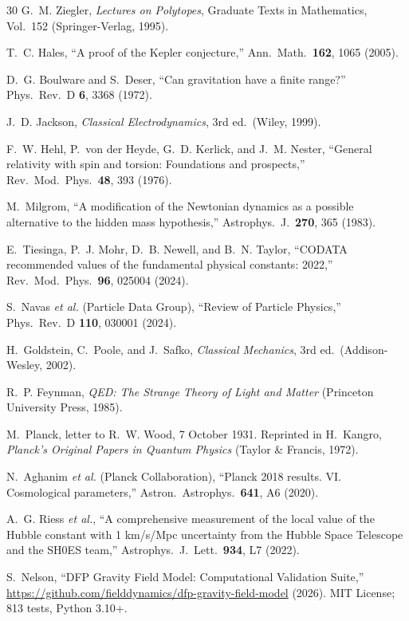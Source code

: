 \documentclass[aps,prd,preprint,superscriptaddress,showpacs,preprintnumbers,amsmath,amssymb,nofootinbib]{revtex4-2}
\begin{document}
\begin{thebibliography}{30}
G.~M. Ziegler, \emph{Lectures on Polytopes}, Graduate Texts in Mathematics, Vol.~152 (Springer-Verlag, 1995).

T.~C. Hales, ``A proof of the Kepler conjecture,'' Ann.\ Math.\ \textbf{162}, 1065 (2005).

D.~G. Boulware and S.~Deser, ``Can gravitation have a finite range?'' Phys.\ Rev.\ D \textbf{6}, 3368 (1972).

J.~D. Jackson, \emph{Classical Electrodynamics}, 3rd ed.\ (Wiley, 1999).

F.~W. Hehl, P.~von der Heyde, G.~D. Kerlick, and J.~M. Nester, ``General relativity with spin and torsion: Foundations and prospects,'' Rev.\ Mod.\ Phys.\ \textbf{48}, 393 (1976).

M.~Milgrom, ``A modification of the Newtonian dynamics as a possible alternative to the hidden mass hypothesis,'' Astrophys.\ J.\ \textbf{270}, 365 (1983).

E.~Tiesinga, P.~J. Mohr, D.~B. Newell, and B.~N. Taylor, ``CODATA recommended values of the fundamental physical constants: 2022,'' Rev.\ Mod.\ Phys.\ \textbf{96}, 025004 (2024).

S.~Navas \textit{et al.} (Particle Data Group), ``Review of Particle Physics,'' Phys.\ Rev.\ D \textbf{110}, 030001 (2024).

H.~Goldstein, C.~Poole, and J.~Safko, \emph{Classical Mechanics}, 3rd ed.\ (Addison-Wesley, 2002).

R.~P. Feynman, \emph{QED: The Strange Theory of Light and Matter} (Princeton University Press, 1985).

M.~Planck, letter to R.~W. Wood, 7 October 1931. Reprinted in H.~Kangro, \emph{Planck's Original Papers in Quantum Physics} (Taylor \& Francis, 1972).

N.~Aghanim \textit{et al.} (Planck Collaboration), ``Planck 2018 results. VI. Cosmological parameters,'' Astron.\ Astrophys.\ \textbf{641}, A6 (2020).

A.~G. Riess \textit{et al.}, ``A comprehensive measurement of the local value of the Hubble constant with 1 km/s/Mpc uncertainty from the Hubble Space Telescope and the SH0ES team,'' Astrophys.\ J.\ Lett.\ \textbf{934}, L7 (2022).

S.~Nelson, ``DFP Gravity Field Model: Computational Validation Suite,'' \url{https://github.com/fielddynamics/dfp-gravity-field-model} (2026). MIT License; 813 tests, Python 3.10+.


\end{thebibliography}
\end{document}
